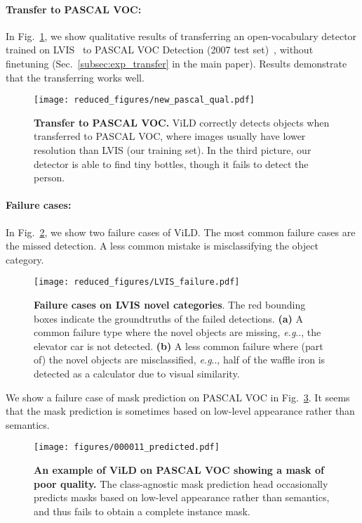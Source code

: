 \documentclass{article} \usepackage{iclr2022_conference,times}
\makeatletter
\DeclareRobustCommand\onedot{\futurelet\@let@token\@onedot}
\def\@onedot{\ifx\@let@token.\else.\null\fi\xspace}
\def\eg{\emph{e.g}\onedot} \def\Eg{\emph{E.g}\onedot}
\makeatother
\begin{document}
\paragraph{Transfer to PASCAL VOC:}
In Fig.~\ref{fig:pascal_qual}, we show qualitative results of transferring an open-vocabulary detector trained on LVIS~\citep{lvis} to PASCAL VOC Detection (2007 test set)~\citep{pascal}, without finetuning (Sec.~\ref{subsec:exp_transfer} in the main paper). Results demonstrate that the transferring works well. 
\begin{figure}[h]
\centering
    \texttt{[image: reduced\_figures/new\_pascal\_qual.pdf]}
    \vspace{-3.5ex}
    \caption{\textbf{Transfer to PASCAL VOC.} ViLD correctly detects objects when transferred to PASCAL VOC, where images usually have lower resolution than LVIS (our training set). In the third picture, our detector is able to find tiny bottles, though it fails to detect the person.}
    \label{fig:pascal_qual}
\end{figure}


\paragraph{Failure cases:}
In Fig.~\ref{fig:lvis_failure}, we show two failure cases of ViLD. The most common failure cases are the missed detection. A less common mistake is misclassifying the object category.
\begin{figure}[h]
\centering
   \texttt{[image: reduced\_figures/LVIS\_failure.pdf]}
   \vspace{-1ex}
   \caption{\textbf{Failure cases on LVIS novel categories}. The red bounding boxes indicate the groundtruths of the failed detections. \textbf{(a)} A common failure type where the novel objects are missing, \eg, the elevator car is not detected. \textbf{(b)} A less common failure where (part of) the novel objects are misclassified, \eg, half of the waffle iron is detected as a calculator due to visual similarity. }
\label{fig:lvis_failure}
\vspace{1ex}
\end{figure}


We show a failure case of mask prediction on PASCAL VOC in Fig.~\ref{fig:localization_error}.
It seems that the mask prediction is sometimes based on low-level appearance rather than semantics.

\begin{figure}[h]
\centering
    \texttt{[image: figures/000011\_predicted.pdf]}
    \vspace{-1ex}
    \caption{\textbf{An example of ViLD on PASCAL VOC showing a mask of poor quality.} The class-agnostic mask prediction head occasionally predicts masks based on low-level appearance rather than semantics, and thus fails to obtain a complete instance mask.}
    \label{fig:localization_error}
    \vspace{-1ex}
\end{figure}
\end{document}
